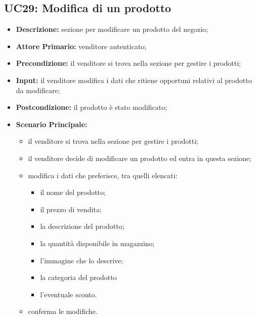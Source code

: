 \subsection{UC29: Modifica di un prodotto}
\label{sec:UC29}
\begin{itemize}
    \item \textbf{Descrizione:} sezione per modificare un prodotto del negozio;
    \item \textbf{Attore Primario:} venditore autenticato;
    \item \textbf{Precondizione:} il venditore si trova nella sezione per gestire i prodotti;
    \item \textbf{Input:} il venditore modifica i dati che ritiene opportuni relativi al prodotto da modificare;
    \item \textbf{Postcondizione:} il prodotto è stato modificato;
    \item \textbf{Scenario Principale:}
          \begin{itemize}
              \item il venditore si trova nella sezione per gestire i prodotti;
              \item il venditore decide di modificare un prodotto ed entra in questa sezione;
              \item modifica i dati che preferisce, tra quelli elencati:
                    \begin{itemize}
                        \item il nome del prodotto;
                        \item il prezzo di vendita;
                        \item la descrizione del prodotto;
                        \item la quantità disponibile in magazzino;
                        \item l'immagine che lo descrive;
                        \item la categoria del prodotto
                        \item l'eventuale sconto.
                    \end{itemize}
              \item conferma le modifiche.
          \end{itemize}
\end{itemize}